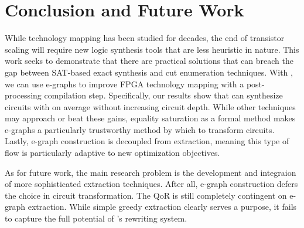 \section{Conclusion and Future Work}\label{sec:conclusion}
While technology mapping has been studied for decades, the end of transistor
scaling will require new logic synthesis tools that are less heuristic in
nature. This work seeks to demonstrate that there are practical solutions that
can breach the gap between SAT-based exact synthesis and cut enumeration
techniques. With \shortname{}, we can use e-graphs to improve FPGA technology
mapping with a post-processing compilation step. Specifically, our results show
that \shortname{} can synthesize circuits with \metric{} on average without
increasing circuit depth. While other techniques may approach or beat these
gains, equality saturation as a formal method makes e-graphs a particularly
trustworthy method by which to transform circuits. Lastly, e-graph construction
is decoupled from extraction, meaning this type of flow is particularly
adaptive to new optimization objectives.

As for future work, the main research problem is the development and integraion
of more sophisticated extraction techniques. After all, e-graph construction
defers the choice in circuit transformation. The QoR is still completely
contingent on e-graph extraction. While simple greedy extraction clearly serves
a purpose, it fails to capture the full potential of \shortname{}'s rewriting
system.